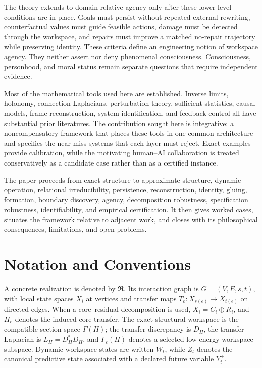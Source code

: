 \documentclass[11pt,letterpaper]{article}
\theoremstyle{plain}
\theoremstyle{definition}
\begin{document}
The theory extends to domain-relative agency only after these lower-level conditions are in place. Goals
must persist without repeated external rewriting, counterfactual values must guide feasible actions, damage
must be detected through the workspace, and repairs must improve a matched no-repair trajectory while
preserving identity. These criteria define an engineering notion of workspace agency. They neither assert
nor deny phenomenal consciousness. Consciousness, personhood, and moral status remain separate questions
that require independent evidence.

Most of the mathematical tools used here are established. Inverse limits, holonomy, connection Laplacians,
perturbation theory, sufficient statistics, causal models, frame reconstruction, system identification, and
feedback control all have substantial prior literatures. The contribution sought here is integrative: a
noncompensatory framework that places these tools in one common architecture and specifies the near-miss
systems that each layer must reject. Exact examples provide calibration, while the motivating human--AI
collaboration is treated conservatively as a candidate case rather than as a certified instance.

The paper proceeds from exact structure to approximate structure, dynamic operation, relational
irreducibility, persistence, reconstruction, identity, gluing, formation, boundary discovery, agency,
decomposition robustness, specification robustness, identifiability, and empirical certification. It then
gives worked cases, situates the framework relative to adjacent work, and closes with its philosophical
consequences, limitations, and open problems.

\section*{Notation and Conventions}

A concrete realization is denoted by \(\mathfrak R\). Its interaction graph is \(G=(V,E,s,t)\), with local
state spaces \(X_i\) at vertices and transfer maps \(T_e:X_{s(e)}\to X_{t(e)}\) on directed edges. When a
core--residual decomposition is used, \(X_i=C_i\oplus R_i\), and \(H_e\) denotes the induced core transfer.
The exact structural workspace is the compatible-section space \(\Gamma(H)\); the transfer discrepancy is
\(D_H\), the transfer Laplacian is \(L_H=D_H^*D_H\), and \(\Gamma_\varepsilon(H)\) denotes a selected
low-energy workspace subspace. Dynamic workspace states are written \(W_t\), while \(Z_t\) denotes the
canonical predictive state associated with a declared future variable \(Y_t^+\).
\end{document}
